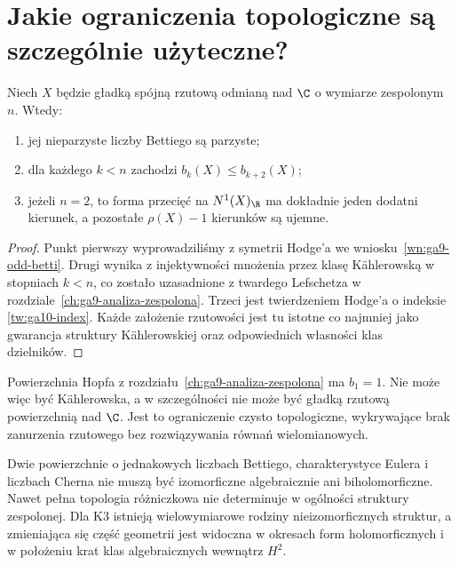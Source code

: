 \section{Jakie ograniczenia topologiczne są szczególnie użyteczne?}
\label{sec:ga10-konsekwencje}

\begin{stwierdzenie}
Niech $X$ będzie gładką spójną rzutową odmianą nad $\C$
o wymiarze zespolonym $n$. Wtedy:
\begin{enumerate}[label=\arabic*)]
\item jej nieparzyste liczby Bettiego są parzyste;
\item dla każdego $k<n$ zachodzi $b_k(X)\le b_{k+2}(X)$;
\item jeżeli $n=2$, to forma przecięć na $N^1(X)_{\R}$
ma dokładnie jeden dodatni kierunek, a pozostałe
$\rho(X)-1$ kierunków są ujemne.
\end{enumerate}
\end{stwierdzenie}
\begin{proof}
Punkt pierwszy wyprowadziliśmy z symetrii Hodge'a
we wniosku~\ref{wn:ga9-odd-betti}. Drugi wynika z
injektywności mnożenia przez klasę Kählerowską
w stopniach $k<n$, co zostało uzasadnione z twardego
Lefschetza w rozdziale~\ref{ch:ga9-analiza-zespolona}.
Trzeci jest twierdzeniem Hodge'a o indeksie
\ref{tw:ga10-index}. Każde założenie rzutowości
jest tu istotne co najmniej jako gwarancja struktury
Kählerowskiej oraz odpowiednich własności klas dzielników.
\end{proof}

\begin{przyklad}
Powierzchnia Hopfa z rozdziału~\ref{ch:ga9-analiza-zespolona}
ma $b_1=1$. Nie może więc być Kählerowska,
a w szczególności nie może być gładką rzutową
powierzchnią nad $\C$. Jest to ograniczenie
czysto topologiczne, wykrywające brak zanurzenia
rzutowego bez rozwiązywania równań wielomianowych.
\end{przyklad}

\begin{uwaga}
Dwie powierzchnie o jednakowych liczbach Bettiego,
charakterystyce Eulera i liczbach Cherna nie muszą być
izomorficzne algebraicznie ani biholomorficzne.
Nawet pełna topologia różniczkowa nie determinuje
w ogólności struktury zespolonej. Dla K3 istnieją
wielowymiarowe rodziny nieizomorficznych struktur,
a zmieniająca się część geometrii jest widoczna
w okresach form holomorficznych i w położeniu krat
klas algebraicznych wewnątrz $H^2$.
\end{uwaga}

